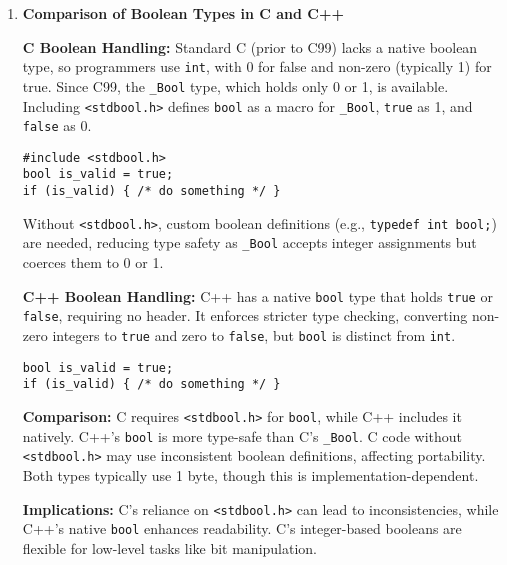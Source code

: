 \documentclass[a4paper,12pt]{article}
\begin{document}
\begin{enumerate}

\subsubsection{Answers for long form questions}

\item \textbf{Comparison of Boolean Types in C and C++}

\textbf{C Boolean Handling:} Standard C (prior to C99) lacks a native boolean type, so programmers use \texttt{int}, with 0 for false and non-zero (typically 1) for true. Since C99, the \texttt{\_Bool} type, which holds only 0 or 1, is available. Including \texttt{<stdbool.h>} defines \texttt{bool} as a macro for \texttt{\_Bool}, \texttt{true} as 1, and \texttt{false} as 0.

\begin{lstlisting}
#include <stdbool.h>
bool is_valid = true;
if (is_valid) { /* do something */ }
\end{lstlisting}

Without \texttt{<stdbool.h>}, custom boolean definitions (e.g., \texttt{typedef int bool;}) are needed, reducing type safety as \texttt{\_Bool} accepts integer assignments but coerces them to 0 or 1.

\textbf{C++ Boolean Handling:} C++ has a native \texttt{bool} type that holds \texttt{true} or \texttt{false}, requiring no header. It enforces stricter type checking, converting non-zero integers to \texttt{true} and zero to \texttt{false}, but \texttt{bool} is distinct from \texttt{int}.

\begin{lstlisting}
bool is_valid = true;
if (is_valid) { /* do something */ }
\end{lstlisting}

\textbf{Comparison:} C requires \texttt{<stdbool.h>} for \texttt{bool}, while C++ includes it natively. C++’s \texttt{bool} is more type-safe than C’s \texttt{\_Bool}. C code without \texttt{<stdbool.h>} may use inconsistent boolean definitions, affecting portability. Both types typically use 1 byte, though this is implementation-dependent.

\textbf{Implications:} C’s reliance on \texttt{<stdbool.h>} can lead to inconsistencies, while C++’s native \texttt{bool} enhances readability. C’s integer-based booleans are flexible for low-level tasks like bit manipulation.


\end{enumerate}
\end{document}
